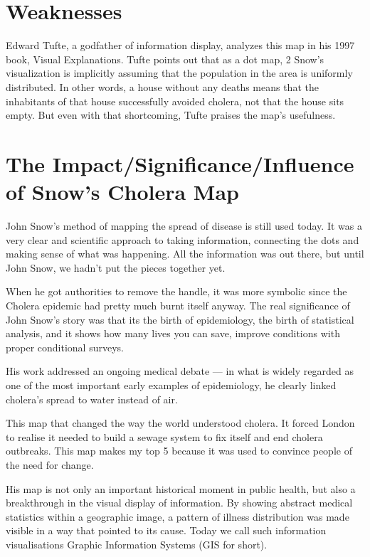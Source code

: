 \documentclass[12pt]{article}
\begin{document}
\section{Weaknesses}

Edward Tufte, a godfather of information display, analyzes this map in his 1997 book, Visual Explanations. Tufte points out that as a dot map, 2 Snow’s visualization is implicitly assuming that the population in the area is uniformly distributed. In other words, a house without any deaths means that the inhabitants of that house successfully avoided cholera, not that the house sits empty. But even with that shortcoming, Tufte praises the map’s usefulness. \cite{blog}

\section{The Impact/Significance/Influence of Snow's Cholera Map}

John Snow's method of mapping the spread of disease is still used today. It was a very clear and scientific approach to taking information, connecting the dots and making sense of what was happening. All the information was out there, but until John Snow, we hadn't put the pieces together yet. \cite{channel1}

When he got authorities to remove the handle, it was more symbolic since the Cholera epidemic had pretty much burnt itself anyway. The real significance of John Snow's story was that its the birth of epidemiology, the birth of statistical analysis, and it shows how many lives you can save, improve conditions with proper conditional surveys. \cite{youtube}

His work addressed an ongoing medical debate — in what is widely regarded as one of the most important early examples of epidemiology, he clearly linked cholera’s spread to water instead of air. \cite{blog}

This map that changed the way the world understood cholera. It forced London to realise it needed to build a sewage system to fix itself and end cholera outbreaks. This map makes my top 5 because it was used to convince people of the need for change. \cite{top5}

His map is not only an important historical moment in public health, but also a breakthrough in the visual display of information. By showing abstract medical statistics within a geographic image, a pattern of illness distribution was made visible in a way that pointed to its cause. Today we call such information visualisations Graphic Information Systems (GIS for short). \cite{test}
\end{document}
